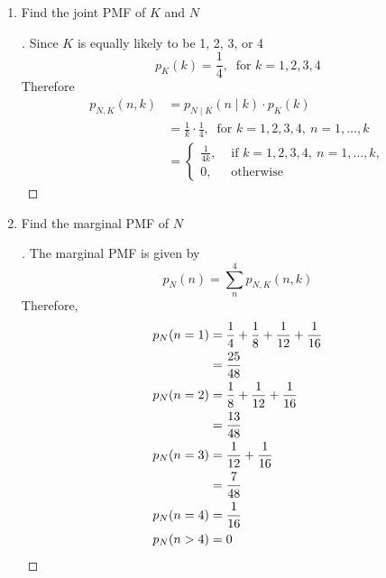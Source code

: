 \documentclass[paper=usletter, fontsize=12pt]{article}
\begin{document}
\begin{enumerate}[label=\textbf{\arabic*}.]
\begin{enumerate}[label=(\alph*)]
            \item Find the joint PMF of $K$ and $N$
            \begin{proof}[\unskip\nopunct]
                Since $K$ is equally likely to be 1, 2, 3, or 4
                \begin{equation*}
                    p_K(k) = \frac{1}{4}, \ \text{ for } k=1,2,3,4
                \end{equation*}
                Therefore
                \begingroup
                \addtolength{\jot}{1em}
                \begin{align*}
                    p_{N , K}(n , k) & = p_{N \mid K}(n \mid k) \cdot p_K(k)\\
                    & = \frac{1}{k}\cdot \frac{1}{4}, \ \text{ for } k=1,2,3,4, \ n=1,\ldots,k \\
                    & = \begin{cases}
                        \frac{1}{4k}, & \text{ if } k=1,2,3,4, \ n=1,\ldots,k,\\
                        0, & \text{ otherwise }
                    \end{cases}
                \end{align*} \qedhere
                \endgroup
            \end{proof}
            \vspace{0.2in}

            \item Find the marginal PMF of $N$
            \begin{proof}[\unskip\nopunct]
                The marginal PMF is given by
                \begin{equation*}
                    p_N(n) = \sum_{n}^{4}p_{N, K}(n,k)
                \end{equation*}
                Therefore,
                \begingroup
                \addtolength{\jot}{1em}
                \begin{align*}
                    p_N(n=1) & = \frac{1}{4} + \frac{1}{8} + \frac{1}{12} + \frac{1}{16} \\
                    & = \frac{25}{48} \\
                    p_N(n=2) & = \frac{1}{8} + \frac{1}{12} + \frac{1}{16} \\
                    & = \frac{13}{48} \\
                    p_N(n=3) & = \frac{1}{12} + \frac{1}{16} \\
                    & = \frac{7}{48} \\
                    p_N(n=4) & = \frac{1}{16} \\
                    p_N(n > 4) & = 0 \qedhere
                \end{align*}
                \endgroup
            \end{proof}
            \vspace{0.2in}


\end{enumerate}
\end{enumerate}
\end{document}
